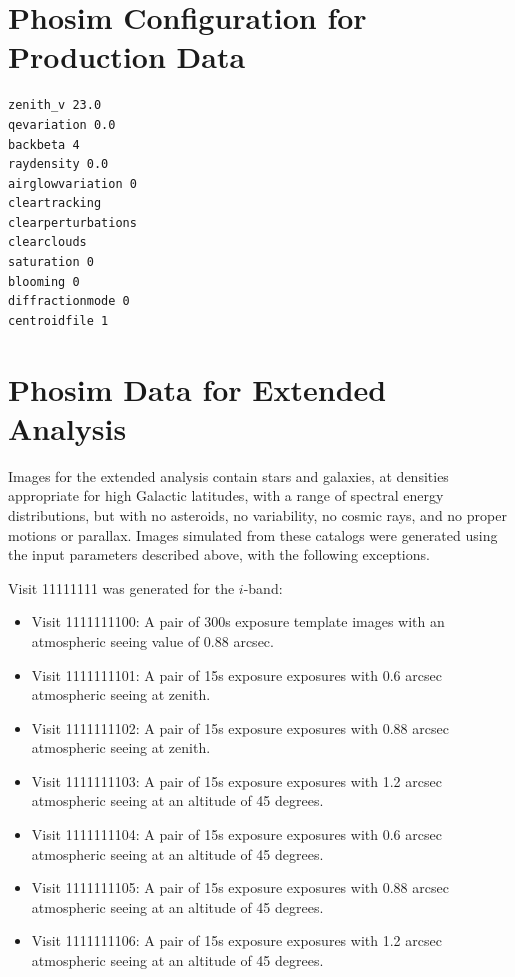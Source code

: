 \documentclass[prd, nofootinbib, floatfix, 11pt,tightenlines,times]{article}
\begin{document}
{\clearpage 
\begin{appendices}
\section{Phosim Configuration for Production Data \label{sec-phosim}}
\begin{verbatim}
zenith_v 23.0
qevariation 0.0
backbeta 4
raydensity 0.0
airglowvariation 0
cleartracking
clearperturbations
clearclouds
saturation 0
blooming 0
diffractionmode 0
centroidfile 1
\end{verbatim}

\section{Phosim Data for Extended Analysis \label{sec-phosimextend}}

Images for the extended analysis contain stars and galaxies, at
densities appropriate for high Galactic latitudes, with a range of
spectral energy distributions, but with no asteroids, no variability,
no cosmic rays, and no proper motions or parallax.  Images simulated
from these catalogs were generated using the input parameters
described above, with the following exceptions.

Visit 11111111 was generated for the $i$-band:
\begin{itemize}
\item Visit 1111111100: A pair of 300s exposure template images with
  an atmospheric seeing value of 0.88 arcsec.
\item Visit 1111111101: A pair of 15s exposure exposures with 0.6
arcsec atmospheric seeing at zenith.
\item Visit 1111111102: A pair of 15s exposure exposures with 0.88
arcsec atmospheric seeing at zenith.
\item Visit 1111111103: A pair of 15s exposure exposures with 1.2
arcsec atmospheric seeing at an altitude of 45 degrees.
\item Visit 1111111104: A pair of 15s exposure exposures with 0.6
arcsec atmospheric seeing at an altitude of 45 degrees.
\item Visit 1111111105: A pair of 15s exposure exposures with 0.88
arcsec atmospheric seeing at an altitude of 45 degrees.
\item Visit 1111111106: A pair of 15s exposure exposures with 1.2
arcsec atmospheric seeing at an altitude of 45 degrees.
\end{itemize}


\end{appendices}}
\end{document}
